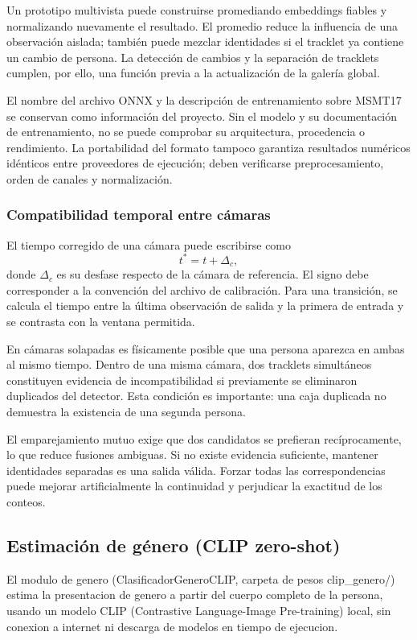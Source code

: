 \documentclass[12pt,letterpaper]{article}
\begin{document}
Un prototipo multivista puede construirse promediando embeddings fiables y normalizando nuevamente el resultado. El promedio reduce la influencia de una observación aislada; también puede mezclar identidades si el tracklet ya contiene un cambio de persona. La detección de cambios y la separación de tracklets cumplen, por ello, una función previa a la actualización de la galería global.

El nombre del archivo ONNX y la descripción de entrenamiento sobre MSMT17 se conservan como información del proyecto. Sin el modelo y su documentación de entrenamiento, no se puede comprobar su arquitectura, procedencia o rendimiento. La portabilidad del formato tampoco garantiza resultados numéricos idénticos entre proveedores de ejecución; deben verificarse preprocesamiento, orden de canales y normalización.

\subsubsection{Compatibilidad temporal entre cámaras}
El tiempo corregido de una cámara puede escribirse como
\[
 t^{*}=t+\Delta_c,
\]
donde $\Delta_c$ es su desfase respecto de la cámara de referencia. El signo debe corresponder a la convención del archivo de calibración. Para una transición, se calcula el tiempo entre la última observación de salida y la primera de entrada y se contrasta con la ventana permitida.

En cámaras solapadas es físicamente posible que una persona aparezca en ambas al mismo tiempo. Dentro de una misma cámara, dos tracklets simultáneos constituyen evidencia de incompatibilidad si previamente se eliminaron duplicados del detector. Esta condición es importante: una caja duplicada no demuestra la existencia de una segunda persona.

El emparejamiento mutuo exige que dos candidatos se prefieran recíprocamente, lo que reduce fusiones ambiguas. Si no existe evidencia suficiente, mantener identidades separadas es una salida válida. Forzar todas las correspondencias puede mejorar artificialmente la continuidad y perjudicar la exactitud de los conteos.


\subsection{Estimación de género (CLIP zero-shot)}

El modulo de genero (ClasificadorGeneroCLIP, carpeta de pesos clip\_genero/) estima la presentacion de genero a partir del cuerpo completo de la persona, usando un modelo CLIP (Contrastive Language-Image Pre-training) local, sin conexion a internet ni descarga de modelos en tiempo de ejecucion.
\end{document}
